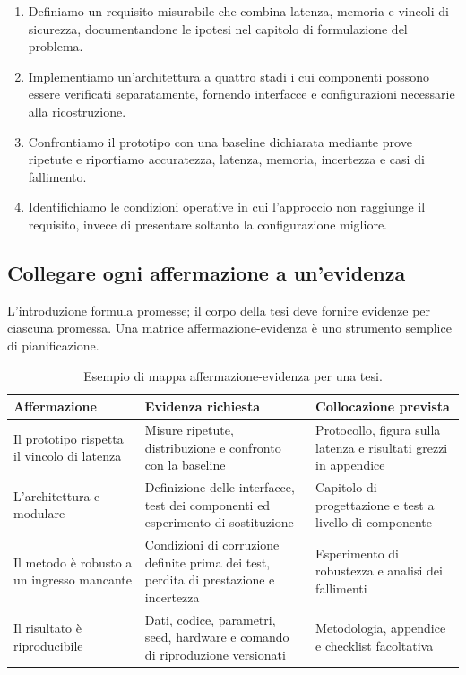 \begin{keypoint}
\begin{enumerate}
  \item Definiamo un requisito misurabile che combina latenza, memoria e vincoli
        di sicurezza, documentandone le ipotesi nel capitolo di formulazione del
        problema.
  \item Implementiamo un'architettura a quattro stadi i cui componenti possono
        essere verificati separatamente, fornendo interfacce e configurazioni
        necessarie alla ricostruzione.
  \item Confrontiamo il prototipo con una baseline dichiarata mediante prove
        ripetute e riportiamo accuratezza, latenza, memoria, incertezza e casi di
        fallimento.
  \item Identifichiamo le condizioni operative in cui l'approccio non raggiunge
        il requisito, invece di presentare soltanto la configurazione migliore.
\end{enumerate}
\end{keypoint}

\subsection{Collegare ogni affermazione a un'evidenza}
L'introduzione formula promesse; il corpo della tesi deve fornire evidenze per
ciascuna promessa. Una matrice affermazione-evidenza è uno strumento semplice di
pianificazione.

\begin{table}[htbp]
\centering
\caption{Esempio di mappa affermazione-evidenza per una tesi.}
\label{tab:guide-claim-evidence-it}
\begin{tabularx}{\textwidth}{p{}Yp{0.27\textwidth}}
\toprule
Affermazione & Evidenza richiesta & Collocazione prevista\\
\midrule
Il prototipo rispetta il vincolo di latenza & Misure ripetute, distribuzione e
confronto con la baseline & Protocollo, figura sulla latenza e risultati grezzi
in appendice\\
L'architettura e modulare & Definizione delle interfacce, test dei componenti ed
esperimento di sostituzione & Capitolo di progettazione e test a livello di
componente\\
Il metodo è robusto a un ingresso mancante & Condizioni di corruzione definite
prima dei test, perdita di prestazione e incertezza & Esperimento di robustezza e
analisi dei fallimenti\\
Il risultato è riproducibile & Dati, codice, parametri, seed, hardware e comando
di riproduzione versionati & Metodologia, appendice e checklist facoltativa\\
\bottomrule
\end{tabularx}
\end{table}

